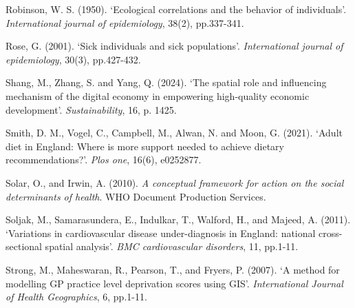 \begin{Reference}
\begin{flushleft}
Robinson, W. S. (1950). `Ecological correlations and the behavior of individuals'. \textit{International journal of epidemiology}, 38(2), pp.337-341.
\end{flushleft}
\vspace{2pt}


\begin{flushleft}
Rose, G. (2001). `Sick individuals and sick populations'. \textit{International journal of epidemiology}, 30(3), pp.427-432.
\end{flushleft}
\vspace{2pt}


\begin{flushleft}
Shang, M., Zhang, S. and Yang, Q. (2024). `The spatial role and influencing mechanism of the digital economy in empowering high-quality economic development'. \textit{Sustainability}, 16, p. 1425.
\end{flushleft}
\vspace{2pt}


\begin{flushleft}
Smith, D. M., Vogel, C., Campbell, M., Alwan, N. and Moon, G. (2021). `Adult diet in England: Where is more support needed to achieve dietary recommendations?'. \textit{Plos one}, 16(6), e0252877.
\end{flushleft}
\vspace{7pt}


\begin{flushleft}
Solar, O., and Irwin, A. (2010). \textit{A conceptual framework for action on the social determinants of health}. WHO Document Production Services.
\end{flushleft}
\vspace{2pt}


\begin{flushleft}
Soljak, M., Samarasundera, E., Indulkar, T., Walford, H., and Majeed, A. (2011). `Variations in cardiovascular disease under-diagnosis in England: national cross-sectional spatial analysis'. \textit{BMC cardiovascular disorders}, 11, pp.1-11.
\end{flushleft}
\vspace{2pt}


\begin{flushleft}
Strong, M., Maheswaran, R., Pearson, T., and Fryers, P. (2007). `A method for modelling GP practice level deprivation scores using GIS'. \textit{International Journal of Health Geographics}, 6, pp.1-11.
\end{flushleft}
\vspace{2pt}



\end{Reference}
